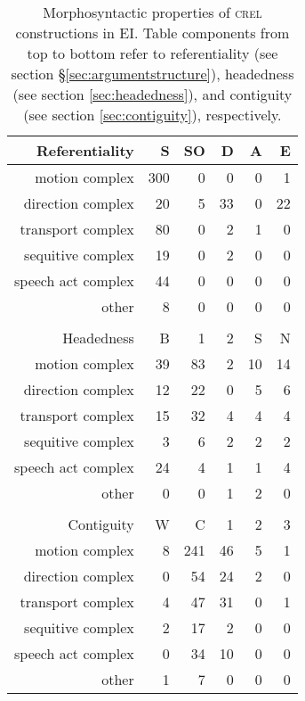 \begin{table}
\centering

\begin{tabular}{rrrrrr}
  \lsptoprule
Referentiality & S & SO & D & A & E \\ 
  \hline
motion complex & 300 &   0 &   0 &   0 &   1 \\ 
  direction complex &  20 &   5 &  33 &   0 &  22 \\ 
  transport complex &  80 &   0 &   2 &   1 &   0 \\ 
  sequitive complex &  19 &   0 &   2 &   0 &   0 \\ 
  speech act complex &  44 &   0 &   0 &   0 &   0 \\ 
  other &   8 &   0 &   0 &   0 &   0 \\ 
   \hline
 \\
  \hline
Headedness & B & 1 & 2 & S & N \\ 
  \hline
motion complex &  39 &  83 &   2 &  10 &  14 \\ 
  direction complex &  12 &  22 &   0 &   5 &   6 \\ 
  transport complex &  15 &  32 &   4 &   4 &   4 \\ 
  sequitive complex &   3 &   6 &   2 &   2 &   2 \\ 
  speech act complex &  24 &   4 &   1 &   1 &   4 \\ 
  other &   0 &   0 &   1 &   2 &   0 \\ 
   \hline
 \\
  \hline
Contiguity & W & C & 1 & 2 & 3 \\ 
  \hline
motion complex &   8 & 241 &  46 &   5 &   1 \\ 
  direction complex &   0 &  54 &  24 &   2 &   0 \\ 
  transport complex &   4 &  47 &  31 &   0 &   1 \\ 
  sequitive complex &   2 &  17 &   2 &   0 &   0 \\ 
  speech act complex &   0 &  34 &  10 &   0 &   0 \\ 
  other &   1 &   7 &   0 &   0 &   0 \\ 
   \hline
\end{tabular}
\caption[Morphosyntactic properties of \textsc{crel} constructions]{Morphosyntactic properties of \textsc{crel} constructions in EI. Table components from top to bottom refer to referentiality (see section §\ref{sec:argumentstructure}), headedness (see section \ref{sec:headedness}), and contiguity (see section \ref{sec:contiguity}), respectively.}
\label{table:crel_formal}

\end{table}


